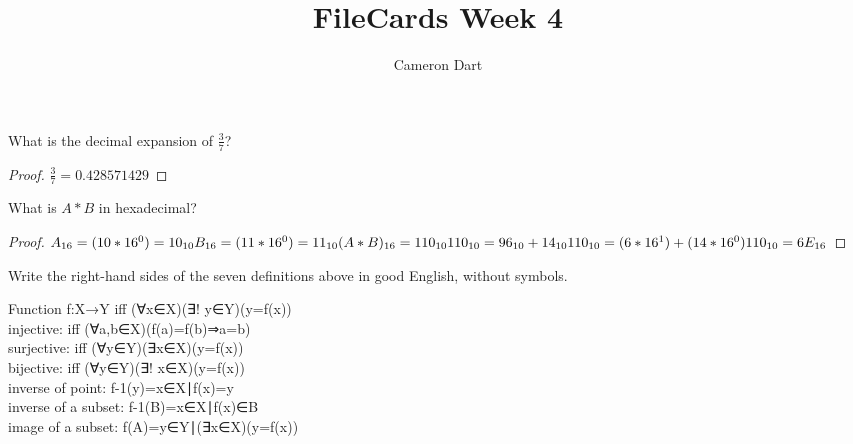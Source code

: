 \documentclass[12pt]{article}
\newenvironment{question}[2][Question]{\begin{trivlist}
\item[\hskip \labelsep {\bfseries #1}\hskip \labelsep {\bfseries #2.}]}{\end{trivlist}}
\begin{document}
 
 
\title{FileCards Week 4}
\author{Cameron Dart}
\maketitle
 
\begin{question}{1}
What is the decimal expansion of $\frac{3}{7}$?
\end{question}

\begin{proof}
$\frac{3}{7} = 0.428571429$
\end{proof}

\begin{question}{2}
What is $A*B$ in hexadecimal?
\end{question}
 
\begin{proof}
$A_{16} = (10*16^0) =10_{10} \\ 
 B_{16} = (11*16^0) =11_{10} \\ 
 (A*B)_{16} = 110_{10} \\ 
 110_{10}=96_{10}+14_{10}\\
 110_{10}=(6*16^1)+(14*16^0)\\
 110_{10}=6E_{16}$
\end{proof}

\begin{question}{3}
Write the right-hand sides of the seven definitions above in good English, without symbols.
\end{question}
Function f:X→Y iff (∀x∈X)(∃! y∈Y)(y=f(x))\\
injective: iff (∀a,b∈X)(f(a)=f(b)⇒a=b)\\
surjective: iff (∀y∈Y)(∃x∈X)(y=f(x))\\
bijective: iff (∀y∈Y)(∃! x∈X)(y=f(x))\\
inverse of point: f-1(y)={x∈X∣f(x)=y}\\
inverse of a subset: f-1(B)={x∈X∣f(x)∈B}\\
image of a subset: f(A)={y∈Y∣(∃x∈X)(y=f(x))}\\
\end{document}
